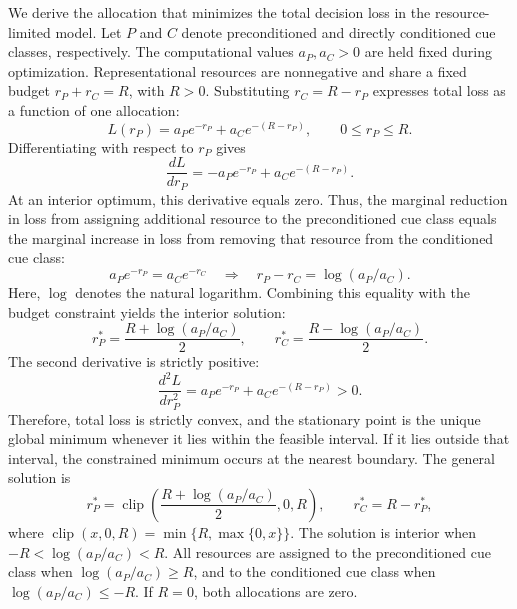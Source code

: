 \documentclass[9pt,twoside,lineno]{pnas-new}
\begin{document}
We derive the allocation that minimizes the total decision loss in the resource-limited model. Let $P$ and $C$ denote preconditioned and directly conditioned cue classes, respectively. The computational values $a_P,a_C>0$ are held fixed during optimization. Representational resources are nonnegative and share a fixed budget $r_P+r_C=R$, with $R>0$. Substituting $r_C=R-r_P$ expresses total loss as a function of one allocation:
\begin{equation}
L(r_P)=a_Pe^{-r_P}+a_Ce^{-(R-r_P)},\qquad 0\leq r_P\leq R.
\tag{S1}
\end{equation}
Differentiating with respect to $r_P$ gives
\begin{equation}
\frac{dL}{dr_P}=-a_Pe^{-r_P}+a_Ce^{-(R-r_P)}.
\tag{S2}
\end{equation}
At an interior optimum, this derivative equals zero. Thus, the marginal reduction in loss from assigning additional resource to the preconditioned cue class equals the marginal increase in loss from removing that resource from the conditioned cue class:
\begin{equation}
a_Pe^{-r_P}=a_Ce^{-r_C}
\quad\Longrightarrow\quad
r_P-r_C=\log(a_P/a_C).
\tag{S3}
\end{equation}
Here, $\log$ denotes the natural logarithm. Combining this equality with the budget constraint yields the interior solution:
\begin{equation}
r_P^*=\frac{R+\log(a_P/a_C)}{2},\qquad
r_C^*=\frac{R-\log(a_P/a_C)}{2}.
\tag{S4}
\end{equation}
The second derivative is strictly positive:
\begin{equation}
\frac{d^2L}{dr_P^2}=a_Pe^{-r_P}+a_Ce^{-(R-r_P)}>0.
\tag{S5}
\end{equation}
Therefore, total loss is strictly convex, and the stationary point is the unique global minimum whenever it lies within the feasible interval. If it lies outside that interval, the constrained minimum occurs at the nearest boundary. The general solution is
\begin{equation}
r_P^*=\operatorname{clip}\!\left(\frac{R+\log(a_P/a_C)}{2},0,R\right),\qquad
r_C^*=R-r_P^*,
\tag{S6}
\end{equation}
where $\operatorname{clip}(x,0,R)=\min\{R,\max\{0,x\}\}$. The solution is interior when $-R<\log(a_P/a_C)<R$. All resources are assigned to the preconditioned cue class when $\log(a_P/a_C)\geq R$, and to the conditioned cue class when $\log(a_P/a_C)\leq -R$. If $R=0$, both allocations are zero.
\end{document}
